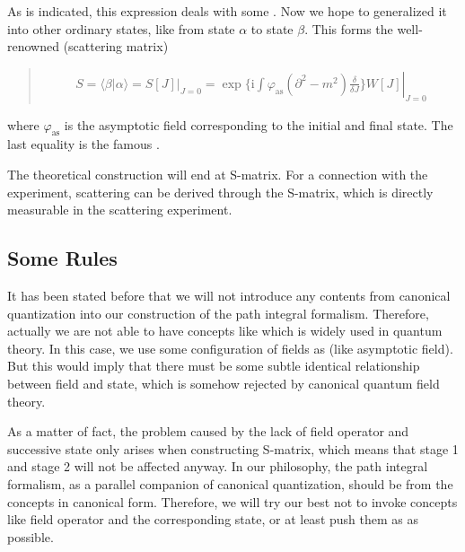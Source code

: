 \documentclass[letterpaper,10pt,english]{sphinxmanual}
\begin{document}
As is indicated, this expression deals with some . Now we hope to generalized it into other ordinary states, like from state \(\alpha\) to state \(\beta\). This forms the well-renowned  (scattering matrix)
\begin{quote}

\begin{equation*}
\begin{split}S = \langle \beta|\alpha\rangle = S[J]|_{J=0} = \left.\exp\{\mathrm{i}\int\varphi_{\text{as}}(\partial^2 - m^2)\frac{\delta}{\delta J}\}W[J]\right|_{J=0}\end{split}
\end{equation*}\end{quote}

where \(\varphi_{\text{as}}\) is the asymptotic field corresponding to the initial and final state. The last equality is the famous .

The theoretical construction will end at S-matrix. For a connection with the experiment, scattering  can be derived through the S-matrix, which is directly measurable in the scattering experiment.


\subsection{Some Rules}
\label{\detokenize{qft_sketch:some-rules}}
It has been stated before that we will not introduce any contents from canonical quantization into our construction of the path integral formalism. Therefore, actually we are not able to have concepts like  which is widely used in quantum theory. In this case, we  use some configuration of fields as  (like asymptotic field). But this would imply that there must be some subtle identical relationship between field and state, which is somehow rejected by canonical quantum field theory.

As a matter of fact, the problem caused by the lack of field operator and successive state only arises when constructing S-matrix, which means that stage 1 and stage 2 will not be affected anyway. In our philosophy, the path integral formalism, as a parallel companion of canonical quantization, should be  from the concepts in canonical form. Therefore, we will try our best not to invoke concepts like field operator and the corresponding state, or at least push them as  as possible.
\end{document}
